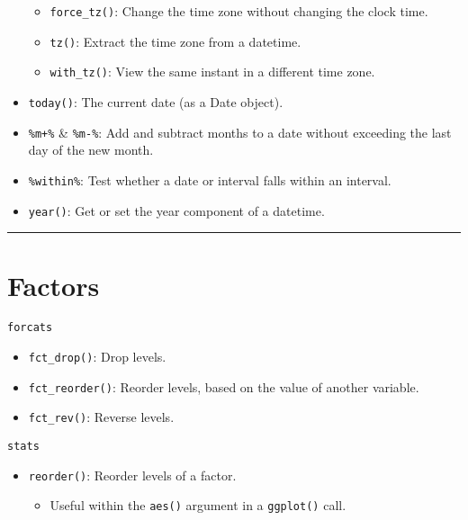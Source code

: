 \documentclass[]{book}
\providecommand{\tightlist}{%
  \setlength{\itemsep}{0pt}\setlength{\parskip}{0pt}}
\begin{document}
\begin{itemize}
  \begin{itemize}
  \tightlist
  \item
    \texttt{force\_tz()}: Change the time zone without changing the clock time.
  \item
    \texttt{tz()}: Extract the time zone from a datetime.
  \item
    \texttt{with\_tz()}: View the same instant in a different time zone.
  \end{itemize}
\item
  \texttt{today()}: The current date (as a Date object).
\item
  \texttt{\%m+\%} \& \texttt{\%m-\%}: Add and subtract months to a date without exceeding the last day of the new month.
\item
  \texttt{\%within\%}: Test whether a date or interval falls within an interval.
\item
  \texttt{year()}: Get or set the year component of a datetime.
\end{itemize}

\begin{center}\rule{0.5\linewidth}{\linethickness}\end{center}

\hypertarget{factors}{%
\section{Factors}\label{factors}}

\texttt{forcats}

\begin{itemize}
\tightlist
\item
  \texttt{fct\_drop()}: Drop levels.
\item
  \texttt{fct\_reorder()}: Reorder levels, based on the value of another variable.
\item
  \texttt{fct\_rev()}: Reverse levels.
\end{itemize}

\texttt{stats}

\begin{itemize}
\tightlist
\item
  \texttt{reorder()}: Reorder levels of a factor.

  \begin{itemize}
  \tightlist
  \item
    Useful within the \texttt{aes()} argument in a \texttt{ggplot()} call.
  \end{itemize}
\end{itemize}
\end{document}

